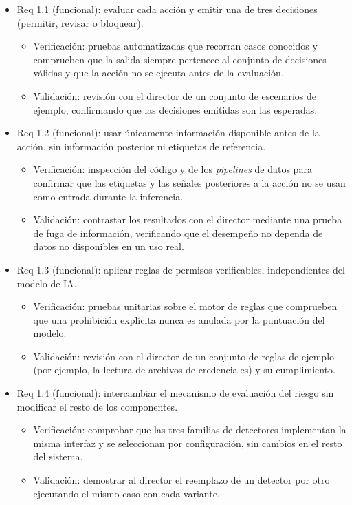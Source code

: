 \documentclass[
11pt, %
]{charter}
\begin{document}
\begin{itemize}
\item Req 1.1 (funcional): evaluar cada acción y emitir una de tres decisiones (permitir, revisar o bloquear).
	\begin{itemize}
		\item Verificación: pruebas automatizadas que recorran casos conocidos y comprueben que la salida siempre pertenece al conjunto de decisiones válidas y que la acción no se ejecuta antes de la evaluación.
		\item Validación: revisión con el director de un conjunto de escenarios de ejemplo, confirmando que las decisiones emitidas son las esperadas.
	\end{itemize}

\item Req 1.2 (funcional): usar únicamente información disponible antes de la acción, sin información posterior ni etiquetas de referencia.
	\begin{itemize}
		\item Verificación: inspección del código y de los \textit{pipelines} de datos para confirmar que las etiquetas y las señales posteriores a la acción no se usan como entrada durante la inferencia.
		\item Validación: contrastar los resultados con el director mediante una prueba de fuga de información, verificando que el desempeño no dependa de datos no disponibles en un uso real.
	\end{itemize}

\item Req 1.3 (funcional): aplicar reglas de permisos verificables, independientes del modelo de IA.
	\begin{itemize}
		\item Verificación: pruebas unitarias sobre el motor de reglas que comprueben que una prohibición explícita nunca es anulada por la puntuación del modelo.
		\item Validación: revisión con el director de un conjunto de reglas de ejemplo (por ejemplo, la lectura de archivos de credenciales) y su cumplimiento.
	\end{itemize}

\item Req 1.4 (funcional): intercambiar el mecanismo de evaluación del riesgo sin modificar el resto de los componentes.
	\begin{itemize}
		\item Verificación: comprobar que las tres familias de detectores implementan la misma interfaz y se seleccionan por configuración, sin cambios en el resto del sistema.
		\item Validación: demostrar al director el reemplazo de un detector por otro ejecutando el mismo caso con cada variante.
	\end{itemize}


\end{itemize}
\end{document}
